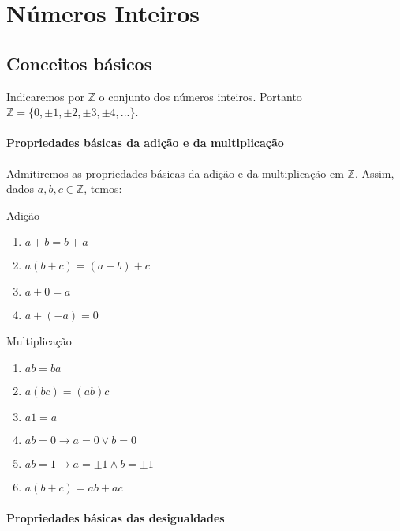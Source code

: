 \chapter{N{\'u}meros Inteiros}
\section{Conceitos b{\'a}sicos}

\hspace{0,5cm}Indicaremos por $\mathbb{Z}$ o conjunto dos n{\'u}meros inteiros. Portanto $\mathbb{Z}=\{0,\pm 1,\pm 2,\pm 3, \pm 4,...\}$.

\subsubsection{Propriedades b{\'a}sicas da adi{\c c}{\~a}o e da multiplica{\c c}{\~a}o}

Admitiremos as propriedades b{\'a}sicas da adi{\c c}{\~a}o e da multiplica{\c c}{\~a}o em $\mathbb{Z}$. Assim, dados $a,b,c\in\mathbb{Z}$, temos:\\

\begin{minipage}[l]{0,5\textwidth}
Adi{\c c}{\~a}o
\begin{enumerate}
\item $a+b=b+a$
\item $a(b+c)=(a+b)+c$
\item $a+0=a$
\item $a+(-a)=0$
\end{enumerate}
\end{minipage}
\begin{minipage}[r]{0,5\textwidth}
Multiplica{\c c}{\~a}o
\begin{enumerate}
\item $ab=ba$
\item $a(bc)=(ab)c$
\item $a1=a$
\item $ab=0\rightarrow a=0\vee b=0$
\item $ab=1\rightarrow a=\pm 1\wedge b=\pm 1$
\item $a(b+c)=ab+ac$
\end{enumerate}
\end{minipage}

\subsubsection{Propriedades b{\'a}sicas das desigualdades}

